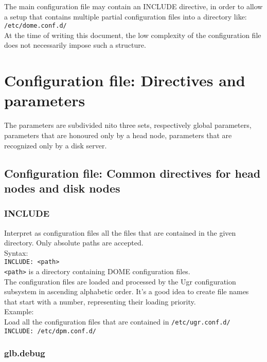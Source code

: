\documentclass[a4paper,10pt]{scrreprt}
\begin{document}
The main configuration file may contain an INCLUDE directive, in order to allow a setup that contains multiple partial configuration files into a directory like:\\

\lstinline"/etc/dome.conf.d/"\\

At the time of writing this document, the low complexity of the configuration file does not necessarily impose such a structure.

\section{Configuration file: Directives and parameters}
The parameters are subdivided nito three sets, respectively global parameters, parameters that are honoured only by a head node, parameters that are recognized only by a disk server.



\subsection{Configuration file: Common directives for head nodes and disk nodes}

\subsubsection{INCLUDE}
Interpret as configuration files all the files that are contained in the given directory.
Only absolute paths are accepted.\\

Syntax:\\

\lstinline"INCLUDE: <path>"\\

\lstinline"<path>" is a directory containing DOME configuration files.\\

The configuration files are loaded and processed by the Ugr configuration subsystem
in ascending alphabetic order. It's a good idea to create file names that start with a number,
representing their loading priority.\\

Example:\\
Load all the configuration files that are contained in \lstinline"/etc/ugr.conf.d/"\\
\lstinline"INCLUDE: /etc/dpm.conf.d/"

\subsubsection{glb.debug}
\end{document}
